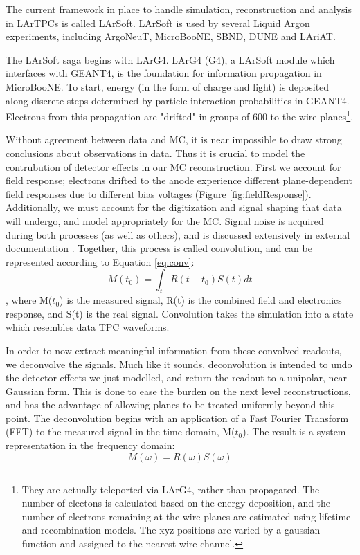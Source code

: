 \documentclass[12pt]{article}
\begin{document}
\par The current framework in place to handle simulation, reconstruction and analysis in LArTPCs is called LArSoft. LArSoft is used by several Liquid Argon experiments, including ArgoNeuT, MicroBooNE, SBND, DUNE and LAriAT. 
\par The LArSoft saga begins with LArG4. LArG4 (G4), a LArSoft module which interfaces with GEANT4, is the foundation for information propagation in MicroBooNE. To start, energy (in the form of charge and light) is deposited along discrete steps determined by particle interaction probabilities in GEANT4.  Electrons from this propagation are "drifted" in groups of 600 to the wire planes\footnote{They are actually teleported via LArG4, rather than propagated. The number of electons is calculated based on the energy deposition, and the number of electrons remaining at the wire planes are estimated using lifetime and recombination models.  The xyz positions are varied by a gaussian function and assigned to the nearest wire channel. }. 
\par Without agreement between data and MC, it is near impossible to draw strong conclusions about observations in data.  Thus it is crucial to model the contrubution of detector effects in our MC reconstruction.  First we account for field response; electrons drifted to the anode experience different plane-dependent field responses due to different bias voltages (Figure \ref{fig:fieldResponse}). Additionally, we must account for the digitization and signal shaping that data will undergo, and model appropriately for the MC. Signal noise is acquired during both processes (as well as others), and is discussed extensively in external documentation \cite{bib:noise}.  Together, this process is called convolution, and can be represented according to Equation \ref{eq:conv}:
\begin{equation}
M(t_0) = \int_{t} R(t - t_0) S(t) dt
\end{equation}
, where M($t_0$) is the measured signal, R(t) is the combined field and electronics response, and S(t) is the real signal.  Convolution takes the simulation into a state which resembles data TPC waveforms.  
\par In order to now extract meaningful information from these convolved readouts, we deconvolve the signals.  Much like it sounds, deconvolution is intended to undo the detector effects we just modelled, and return the readout to a unipolar, near-Gaussian form. This is done to ease the burden on the next level reconstructions, and has the advantage of allowing planes to be treated uniformly beyond this point. The deconvolution begins with an application of a Fast Fourier Transform (FFT) to the measured signal in the time domain, M($t_0$). The result is a system representation in the frequency domain:
\begin{equation}
M(\omega) = R(\omega)S(\omega) 
\end{equation}
\end{document}
